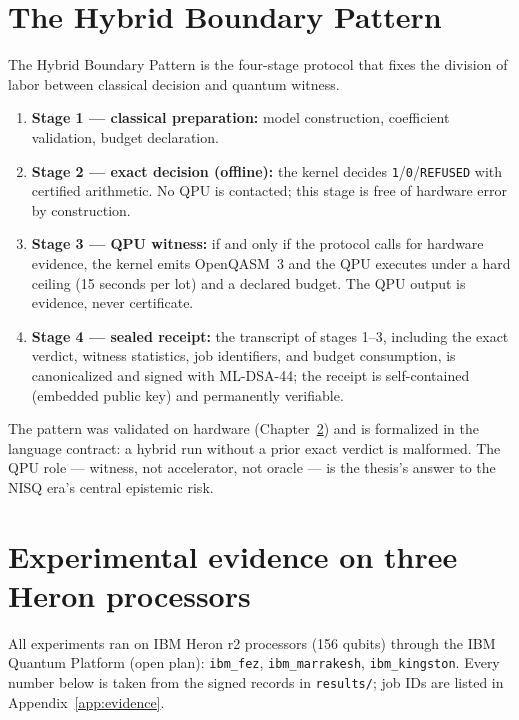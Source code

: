 \documentclass[11pt,a4paper]{report}
\begin{document}
\chapter{The Hybrid Boundary Pattern}
\label{ch:hybrid}

The Hybrid Boundary Pattern is the four-stage protocol that fixes the
division of labor between classical decision and quantum witness.
\begin{enumerate}
  \item \textbf{Stage 1 --- classical preparation:} model construction,
        coefficient validation, budget declaration.
  \item \textbf{Stage 2 --- exact decision (offline):} the kernel decides
        \texttt{1}/\texttt{0}/\texttt{REFUSED} with certified arithmetic.
        No QPU is contacted; this stage is free of hardware error by
        construction.
  \item \textbf{Stage 3 --- QPU witness:} if and only if the protocol
        calls for hardware evidence, the kernel emits OpenQASM~3 and the
        QPU executes under a hard ceiling (15 seconds per lot) and a
        declared budget. The QPU output is evidence, never certificate.
  \item \textbf{Stage 4 --- sealed receipt:} the transcript of stages 1--3,
  including the exact verdict, witness statistics, job identifiers, and
  budget consumption, is canonicalized and signed with ML-DSA-44; the
  receipt is self-contained (embedded public key) and permanently
  verifiable.
\end{enumerate}
The pattern was validated on hardware (Chapter~\ref{ch:experiments}) and is
formalized in the language contract: a hybrid run without a prior exact
verdict is malformed. The QPU role --- witness, not accelerator, not
oracle --- is the thesis's answer to the NISQ era's central epistemic risk.

\chapter{Experimental evidence on three Heron processors}
\label{ch:experiments}

All experiments ran on IBM Heron r2 processors (156 qubits) through the
IBM Quantum Platform (open plan): \texttt{ibm\_fez},
\texttt{ibm\_marrakesh}, \texttt{ibm\_kingston}. Every number below is
taken from the signed records in \texttt{results/}; job IDs are listed in
Appendix~\ref{app:evidence}.
\end{document}
